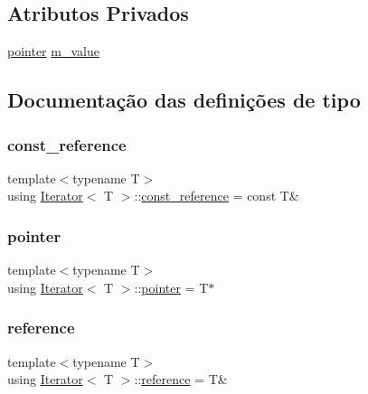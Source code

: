 \subsection*{Atributos Privados}
\begin{DoxyCompactItemize}
\item 
\hyperlink{classIterator_a37c4732ae0b73e9fdc3a585c01750d05}{pointer} \hyperlink{classIterator_af94f1036afce19abec73a51d52f2b817}{m\+\_\+value}
\end{DoxyCompactItemize}


\subsection{Documentação das definições de tipo}
\mbox{\label{classIterator_a1b795038f98a4fcd76a167740fbd1ddb}} 
\subsubsection{\texorpdfstring{const\+\_\+reference}{const\_reference}}
{\footnotesize\ttfamily template$<$typename T$>$ \\
using \hyperlink{classIterator}{Iterator}$<$ T $>$\+::\hyperlink{classIterator_a1b795038f98a4fcd76a167740fbd1ddb}{const\+\_\+reference} =  const T\&}

\mbox{\label{classIterator_a37c4732ae0b73e9fdc3a585c01750d05}} 
\subsubsection{\texorpdfstring{pointer}{pointer}}
{\footnotesize\ttfamily template$<$typename T$>$ \\
using \hyperlink{classIterator}{Iterator}$<$ T $>$\+::\hyperlink{classIterator_a37c4732ae0b73e9fdc3a585c01750d05}{pointer} =  T$\ast$}

\mbox{\label{classIterator_a104c7f213cd33d599aa25277176529d5}} 
\subsubsection{\texorpdfstring{reference}{reference}}
{\footnotesize\ttfamily template$<$typename T$>$ \\
using \hyperlink{classIterator}{Iterator}$<$ T $>$\+::\hyperlink{classIterator_a104c7f213cd33d599aa25277176529d5}{reference} =  T\&}

